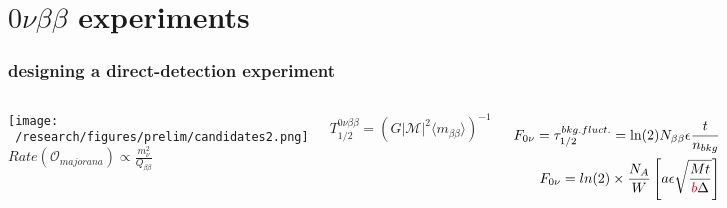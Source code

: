 \documentclass{beamer}
\begin{document}
\section{$0\nu\beta\beta$ experiments}
	
	\begin{frame}
		\frametitle{designing a direct-detection experiment}
		\begin{columns}[c] %
			
			\hspace*{-0.5cm}\texttt{[image: ~/research/figures/prelim/candidates2.png]}
			$Rate \left( \mathcal{O}_{majorana} \right) \propto \frac{m_{\nu}^2}{Q_{\beta\beta}}$
			
			\begin{equation*}
			T_{1/2}^{0\nu\beta\beta} = \left( G|\mathcal{M}|^2 \langle m_{\beta\beta}\rangle \right) ^{-1}
			\end{equation*}
			
%			
			\begin{eqnarray*}
			F_{0\nu} = \tau_{1/2}^{bkg. fluct.} = \text{ln}(2)N_{\beta\beta}\epsilon \frac{t}{n_{bkg}} \\
			F_{0\nu} = ln(2) \times \frac{N_A}{W} \left[ a\epsilon \sqrt{\frac{Mt}{\textcolor{red}{b}\Delta}}\right]
			\end{eqnarray*}
		\end{columns}
	\end{frame}
	
\end{document}
